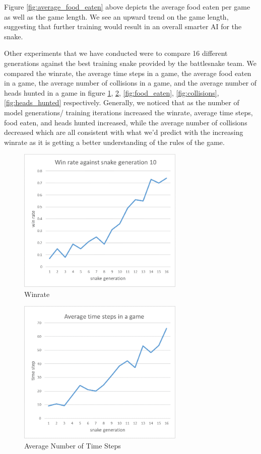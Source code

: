 ﻿\documentclass{article}
\begin{document}
\FloatBarrier

Figure \ref{fig:average_food_eaten} above depicts the average food eaten per
game as well as the game length. We see an upward trend on the game length,
suggesting that further training would result in an overall smarter AI for
the snake.

Other experiments that we have conducted were to compare 16 different
generations against the best training snake provided by the battlesnake team. We
compared the winrate, the average time steps in a game, the average food eaten
in a game, the average number of collisions in a game, and the average number of
heads hunted in a game in figure \ref{fig:winrate}, \ref{fig:time_steps},
\ref{fig:food_eaten}, \ref{fig:collisions}, \ref{fig:heads_hunted} respectively.
Generally, we noticed that as the number of model generations/ training
iterations increased the winrate, average time steps, food eaten, and heads
hunted increased, while the average number of collisions decreased which are all
consistent with what we'd predict with the increasing winrate as it is getting a
better understanding of the rules of the game.

\begin{figure}[!ht]
  \centering
  \includegraphics[width=300px]{winrate}
  \caption{Winrate}
  \label{fig:winrate}
\end{figure}
\FloatBarrier

\begin{figure}[!ht]
  \centering
  \includegraphics[width=300px]{time_steps}
  \caption{Average Number of Time Steps}
  \label{fig:time_steps}
\end{figure}
\FloatBarrier
\end{document}
